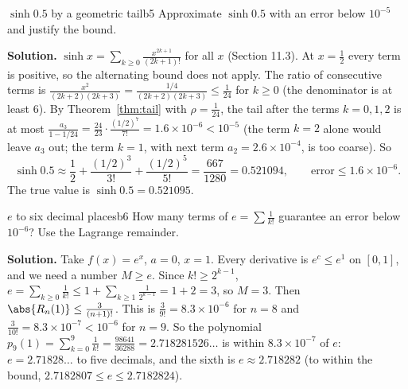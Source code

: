 \documentclass[11pt]{article}
\begin{document}
\begin{exmp}{$\sinh0.5$ by a geometric tail}{b5}
Approximate $\sinh0.5$ with an error below $10^{-5}$ and justify the bound.

\textbf{Solution.} $\sinh x=\sum_{k\ge0}\frac{x^{2k+1}}{(2k+1)!}$ for all $x$ (Section 11.3). At $x=\frac12$ every term is positive, so the alternating bound does not apply. The ratio of consecutive terms is $\frac{x^2}{(2k+2)(2k+3)}=\frac{1/4}{(2k+2)(2k+3)}\le\frac1{24}$ for $k\ge0$ (the denominator is at least $6$). By Theorem~\ref{thm:tail} with $\rho=\frac1{24}$, the tail after the terms $k=0,1,2$ is at most $\frac{a_3}{1-1/24}=\frac{24}{23}\cdot\frac{(1/2)^7}{7!}=1.6\times10^{-6}<10^{-5}$ (the term $k=2$ alone would leave $a_3$ out; the term $k=1$, with next term $a_2=2.6\times10^{-4}$, is too coarse). So
\[
\sinh0.5\approx\frac12+\frac{(1/2)^3}{3!}+\frac{(1/2)^5}{5!}=\frac{667}{1280}=0.521094,\qquad\text{error}\le1.6\times10^{-6}.
\]
The true value is $\sinh0.5=0.521095$.
\end{exmp}

\begin{exmp}{$e$ to six decimal places}{b6}
How many terms of $e=\sum\frac1{k!}$ guarantee an error below $10^{-6}$? Use the Lagrange remainder.

\textbf{Solution.} Take $f(x)=e^x$, $a=0$, $x=1$. Every derivative is $e^c\le e^1$ on $[0,1]$, and we need a number $M\ge e$. Since $k!\ge2^{k-1}$, $e=\sum_{k\ge0}\frac1{k!}\le1+\sum_{k\ge1}\frac1{2^{k-1}}=1+2=3$, so $M=3$. Then $\abs{R_n(1)}\le\frac3{(n+1)!}$. This is $\frac3{9!}=8.3\times10^{-6}$ for $n=8$ and $\frac3{10!}=8.3\times10^{-7}<10^{-6}$ for $n=9$. So the polynomial $p_9(1)=\sum_{k=0}^9\frac1{k!}=\frac{98641}{36288}=2.718281526\ldots$ is within $8.3\times10^{-7}$ of $e$: $e=2.71828\ldots$ to five decimals, and the sixth is $e\approx2.718282$ (to within the bound, $2.7182807\le e\le2.7182824$).
\end{exmp}
\end{document}
